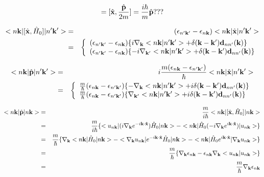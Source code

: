 \documentclass[aps,prb,preprint]{revtex4-1}
\begin{document}
\begin{appendix}
\begin{eqnarray}
[\hat{\bf x}, \hat{H}_0] = [\hat{\bf x}, \frac{\hat{\bf p}}{2m}]  =\frac{i \hbar}{m}\hat{\bf p}???
\end{eqnarray} 


\begin{eqnarray}
<n{\bf k}|[\hat{\bf x},\hat{H}_0]|n'{\bf k'}> &=& (\epsilon_{n'{\bf k'}}-\epsilon_{n{\bf k}}) <n{\bf k}|\hat{\bf x}|n'{\bf k'}> \nonumber \\
&=&\left\{
\begin{array}{l}
(\epsilon_{n'{\bf k'}}-\epsilon_{n{\bf k}})\{i\nabla_{\bf k} <n{\bf k}|n'{\bf k'}> +  \delta({\bf k-k'}) {\bf d}_{nn'}({\bf k})\}  \nonumber \\
(\epsilon_{n'{\bf k'}}-\epsilon_{n{\bf k}})\{-i\nabla_{\bf k'} <n{\bf k}|n'{\bf k'}> +  \delta({\bf k-k'}) {\bf d}_{nn'}({\bf k})\} 
\end{array}
\right.
\end{eqnarray} 

\begin{eqnarray}
<n{\bf k}|\hat{\bf p}|n'{\bf k'}> &=&i \frac{m(\epsilon_{n{\bf k}}-\epsilon_{n'{\bf k'}})}{\hbar} <n{\bf k}|\hat{\bf x}|n'{\bf k'}> \nonumber \\
&=&\left\{
\begin{array}{l}
\frac{m}{\hbar}(\epsilon_{n{\bf k}}-\epsilon_{n'{\bf k'}})\{-\nabla_{\bf k} <n{\bf k}|n'{\bf k'}> + i \delta({\bf k-k'}) {\bf d}_{nn'}({\bf k})\}  \\
\frac{m}{\hbar}(\epsilon_{n{\bf k}}-\epsilon_{n'{\bf k'}})\{\nabla_{\bf k'} <n{\bf k}|n'{\bf k'}> + i \delta({\bf k-k'}) {\bf d}_{nn'}({\bf k})\} 
\end{array}
\right.
\end{eqnarray} 

\begin{eqnarray}
<n{\bf k}|\hat{\bf p}|n{\bf k}> &=& \frac{m}{i \hbar} <n{\bf k}|[\hat{\bf x},\hat{H}_0]|n{\bf k}> \nonumber \\
&=& \frac{m}{i \hbar} \{ <u_{n{\bf k}}| (i \nabla_{\bf k} e^{-i{\bf k \cdot \hat{x} }} ) \hat{H}_0 |n{\bf k}> - <n{\bf k}| \hat{H}_0 (-i\nabla_{\bf k} e^{i{\bf k \cdot \hat{x}} }) |u_{n{\bf k}}> \} \nonumber \\
&=& \frac{m}{\hbar} \{  \nabla_{\bf k} <n{\bf k}|\hat{H}_0|n{\bf k}> - <\nabla_{\bf k} u_{n{\bf k}}| e^{-i{\bf k \cdot \hat{x}} } \hat{H}_0  |n{\bf k}> - <n{\bf k}| \hat{H}_0 e^{i{\bf k \cdot \hat{x}} }|\nabla_{\bf k} u_{n{\bf k}}> \} \nonumber \\
&=& \frac{m}{\hbar} \{  \nabla_{\bf k} \epsilon_{n{\bf k}} -  \epsilon_{n{\bf k}} \nabla_{\bf k} <u_{n{\bf k}}| u_{n{\bf k}}>\}  \nonumber \\
&=& \frac{m}{\hbar} \nabla_{\bf k} \epsilon_{n{\bf k}}
\end{eqnarray} 


\end{appendix}
\end{document}
